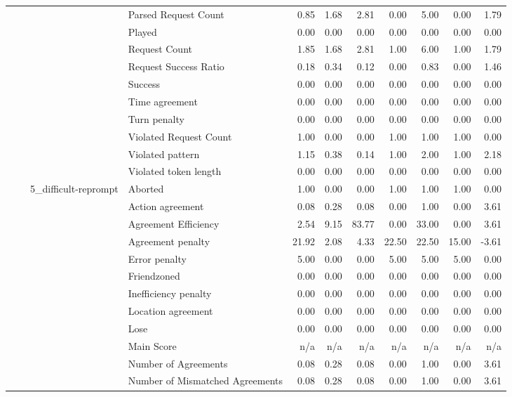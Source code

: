 \begin{tabular}{llllrrrrrrr}
 &  &  & Parsed Request Count & 0.85 & 1.68 & 2.81 & 0.00 & 5.00 & 0.00 & 1.79 \\
 &  &  & Played & 0.00 & 0.00 & 0.00 & 0.00 & 0.00 & 0.00 & 0.00 \\
 &  &  & Request Count & 1.85 & 1.68 & 2.81 & 1.00 & 6.00 & 1.00 & 1.79 \\
 &  &  & Request Success Ratio & 0.18 & 0.34 & 0.12 & 0.00 & 0.83 & 0.00 & 1.46 \\
 &  &  & Success & 0.00 & 0.00 & 0.00 & 0.00 & 0.00 & 0.00 & 0.00 \\
 &  &  & Time agreement & 0.00 & 0.00 & 0.00 & 0.00 & 0.00 & 0.00 & 0.00 \\
 &  &  & Turn penalty & 0.00 & 0.00 & 0.00 & 0.00 & 0.00 & 0.00 & 0.00 \\
 &  &  & Violated Request Count & 1.00 & 0.00 & 0.00 & 1.00 & 1.00 & 1.00 & 0.00 \\
 &  &  & Violated pattern & 1.15 & 0.38 & 0.14 & 1.00 & 2.00 & 1.00 & 2.18 \\
 &  &  & Violated token length & 0.00 & 0.00 & 0.00 & 0.00 & 0.00 & 0.00 & 0.00 \\
\cline{3-11}
 &  & \multirow[t]{27}{*}{5_difficult-reprompt} & Aborted & 1.00 & 0.00 & 0.00 & 1.00 & 1.00 & 1.00 & 0.00 \\
 &  &  & Action agreement & 0.08 & 0.28 & 0.08 & 0.00 & 1.00 & 0.00 & 3.61 \\
 &  &  & Agreement Efficiency & 2.54 & 9.15 & 83.77 & 0.00 & 33.00 & 0.00 & 3.61 \\
 &  &  & Agreement penalty & 21.92 & 2.08 & 4.33 & 22.50 & 22.50 & 15.00 & -3.61 \\
 &  &  & Error penalty & 5.00 & 0.00 & 0.00 & 5.00 & 5.00 & 5.00 & 0.00 \\
 &  &  & Friendzoned & 0.00 & 0.00 & 0.00 & 0.00 & 0.00 & 0.00 & 0.00 \\
 &  &  & Inefficiency penalty & 0.00 & 0.00 & 0.00 & 0.00 & 0.00 & 0.00 & 0.00 \\
 &  &  & Location agreement & 0.00 & 0.00 & 0.00 & 0.00 & 0.00 & 0.00 & 0.00 \\
 &  &  & Lose & 0.00 & 0.00 & 0.00 & 0.00 & 0.00 & 0.00 & 0.00 \\
 &  &  & Main Score & n/a & n/a & n/a & n/a & n/a & n/a & n/a \\
 &  &  & Number of Agreements & 0.08 & 0.28 & 0.08 & 0.00 & 1.00 & 0.00 & 3.61 \\
 &  &  & Number of Mismatched Agreements & 0.08 & 0.28 & 0.08 & 0.00 & 1.00 & 0.00 & 3.61 \\

\end{tabular}
